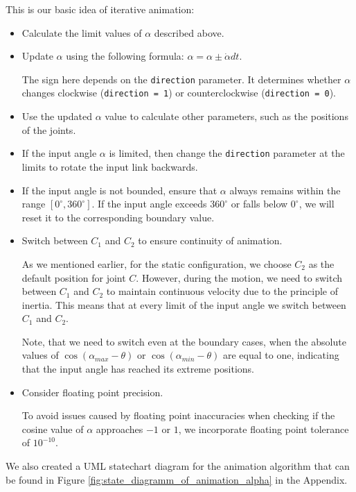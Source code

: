 \documentclass{article}
\begin{document}
This is our basic idea of iterative animation:
\begin{itemize}
	\item Calculate the limit values of $\alpha$ described above.
	
	\item Update $\alpha$ using the following formula: $\alpha = \alpha \pm \dot{\alpha} dt$.
		 
	The sign here depends on the \texttt{direction} parameter. It determines whether $\alpha$ changes clockwise (\texttt{direction = 1}) or counterclockwise (\texttt{direction = 0}).
	 
	\item Use the updated $\alpha$ value to calculate other parameters, such as the positions of the joints.
		 
	\item If the input angle $\alpha$ is limited, then change the \texttt{direction} parameter at the limits to rotate the input link backwards.
		 
	\item If the input angle is not bounded, ensure that $\alpha$ always remains within the range $[0^\circ, 360^\circ]$. If the input angle exceeds $360^\circ$ or falls below $0^\circ$, we will reset it to the corresponding boundary value.
		 
	\item Switch between $C_1$ and $C_2$ to ensure continuity of animation.
	
	As we mentioned earlier, for the static configuration, we choose $C_2$ as the default position for joint $C$. However, during the motion, we need to switch between $C_1$ and $C_2$ to maintain continuous velocity due to the principle of inertia. This means that at every limit of the input angle we switch between $C_1$ and $C_2$.
	
	Note, that we need to switch even at the boundary cases, when the absolute values of $\cos(\alpha_{max}-\theta)$ or $\cos(\alpha_{min}-\theta)$ are equal to one, indicating that the input angle has reached its extreme positions.

	\item Consider floating point precision.
	
	To avoid issues caused by floating point inaccuracies when checking if the cosine value of $\alpha$ approaches $-1$ or $1$, we incorporate floating point tolerance of $10^{-10}$.
\end{itemize}

We also created a UML statechart diagram for the animation algorithm that can be found in Figure \ref{fig:state_diagramm_of_animation_alpha} in the Appendix.
\end{document}
